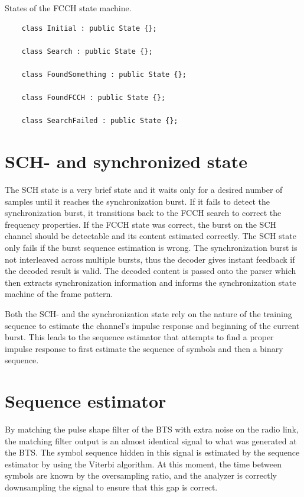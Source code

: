 \begin{listing}
  \caption{States of the \gls{FCCH} state machine.}
  \label{lst:ffsm}
  \begin{verbatim}
    class Initial : public State {};

    class Search : public State {};

    class FoundSomething : public State {};

    class FoundFCCH : public State {};

    class SearchFailed : public State {};
  \end{verbatim}
\end{listing}

\section{SCH- and synchronized state}
The \gls{SCH} state is a very brief state and it waits only for a
desired number of samples until it reaches the synchronization
burst. If it fails to detect the synchronization burst, it transitions
back to the \gls{FCCH} search to correct the frequency properties. If
the \gls{FCCH} state was correct, the burst on the \gls{SCH} channel
should be detectable and its content estimated correctly. The
\gls{SCH} state only fails if the burst sequence estimation is
wrong. The synchronization burst is not interleaved across multiple
bursts, thus the decoder gives instant feedback if the decoded result
is valid. The decoded content is passed onto the parser which then
extracts synchronization information and informs the synchronization
state machine of the frame pattern.

Both the \gls{SCH}- and the synchronization state rely on the nature
of the training sequence to estimate the channel's impulse response
and beginning of the current burst. This leads to the sequence
estimator that attempts to find a proper impulse response to first
estimate the sequence of symbols and then a binary sequence.

\section{Sequence estimator}
By matching the pulse shape filter of the \gls{BTS} with extra noise
on the radio link, the matching filter output is an almost identical
signal to what was generated at the \gls{BTS}. The symbol sequence
hidden in this signal is estimated by the sequence estimator by using
the Viterbi algorithm. At this moment, the time between symbols are
known by the oversampling ratio, and the analyzer is correctly
downsampling the signal to ensure that this gap is correct.

